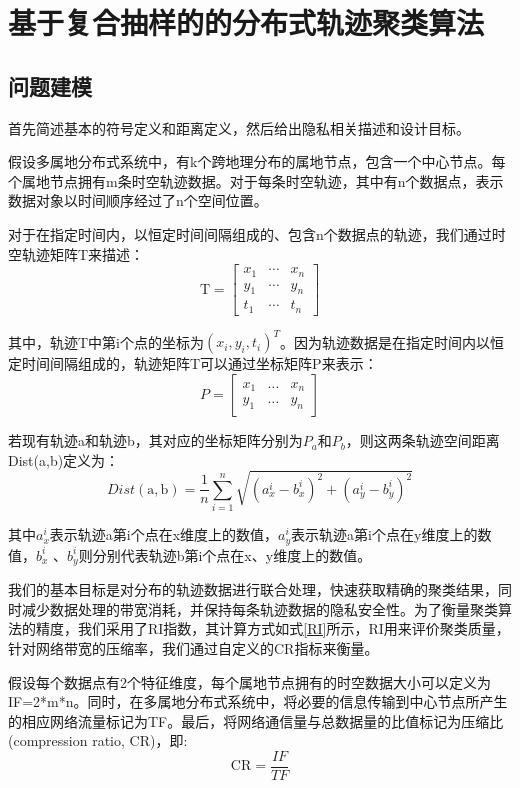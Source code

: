 \section{基于复合抽样的的分布式轨迹聚类算法}

\subsection{问题建模}
首先简述基本的符号定义和距离定义，然后给出隐私相关描述和设计目标。

假设多属地分布式系统中，有k个跨地理分布的属地节点，包含一个中心节点。每个属地节点拥有m条时空轨迹数据。对于每条时空轨迹，其中有n个数据点，表示数据对象以时间顺序经过了n个空间位置。

对于在指定时间内，以恒定时间间隔组成的、包含n个数据点的轨迹，我们通过时空轨迹矩阵T来描述：
\[
\mathrm{T}=\left[\begin{array}{lll}
{x_{1}} & {\cdots} & {x_{n}} \\
{y_{1}} & {\cdots} & {y_{n}} \\
{t_{1}} & {\cdots} & {t_{n}}
\end{array}\right]
\]

其中，轨迹T中第i个点的坐标为$(x_i,y_i,t_i)^T$。因为轨迹数据是在指定时间内以恒定时间间隔组成的，轨迹矩阵T可以通过坐标矩阵P来表示：
\[
P=\left[\begin{array}{lll}
{x_{1}} & {\dots} & {x_{n}} \\
{y_{1}} & {\dots} & {y_{n}}
\end{array}\right]
\]

若现有轨迹a和轨迹b，其对应的坐标矩阵分别为$P_a$和$P_b$，则这两条轨迹空间距离Dist(a,b)定义为：
\begin{equation}
\label{ch3dist}
Dist(\mathrm{a}, \mathrm{b})=\frac{1}{n} \sum_{i=1}^{n} \sqrt{\left(a_{x}^{i}-b_{x}^{i}\right)^{2}+\left(a_{y}^{i}-b_{y}^{i}\right)^{2}}
\end{equation}

其中$a_x^i$表示轨迹a第i个点在x维度上的数值，$a_y^i$表示轨迹a第i个点在y维度上的数值，$b_x^i$ 、$b_y^i$则分别代表轨迹b第i个点在x、y维度上的数值。	

我们的基本目标是对分布的轨迹数据进行联合处理，快速获取精确的聚类结果，同时减少数据处理的带宽消耗，并保持每条轨迹数据的隐私安全性。为了衡量聚类算法的精度，我们采用了RI指数，其计算方式如式\ref{RI}所示，RI用来评价聚类质量，针对网络带宽的压缩率，我们通过自定义的CR指标来衡量。

假设每个数据点有2个特征维度，每个属地节点拥有的时空数据大小可以定义为IF=2*m*n。同时，在多属地分布式系统中，将必要的信息传输到中心节点所产生的相应网络流量标记为TF。最后，将网络通信量与总数据量的比值标记为压缩比(compression ratio, CR)，即:
\begin{equation}
\label{CR}
\mathrm{CR}=\frac{I F}{T F}
\end{equation}

